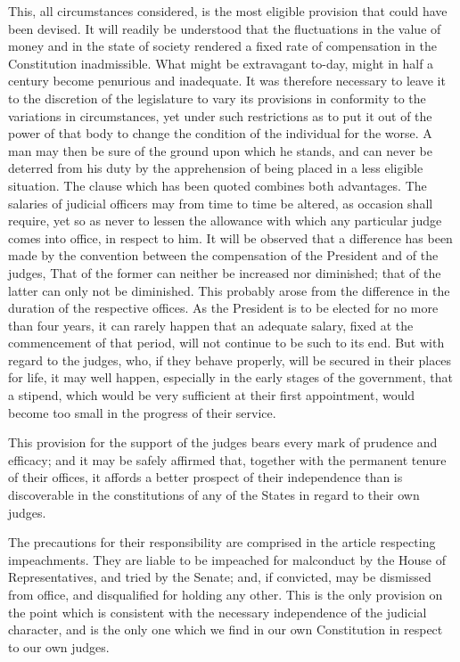 This, all circumstances considered, is the most eligible provision that could have been devised. 
It will readily be understood that the fluctuations in the value of money and in the state of society rendered a fixed rate of compensation in the Constitution inadmissible. 
What might be extravagant to-day, might in half a century become penurious and inadequate. 
It was therefore necessary to leave it to the discretion of the legislature to vary its provisions in conformity to the variations in circumstances, yet under such restrictions as to put it out of the power of that body to change the condition of the individual for the worse. 
A man may then be sure of the ground upon which he stands, and can never be deterred from his duty by the apprehension of being placed in a less eligible situation. 
The clause which has been quoted combines both advantages. 
The salaries of judicial officers may from time to time be altered, as occasion shall require, yet so as never to lessen the allowance with which any particular judge comes into office, in respect to him. 
It will be observed that a difference has been made by the convention between the compensation of the President and of the judges, That of the former can neither be increased nor diminished; that of the latter can only not be diminished. 
This probably arose from the difference in the duration of the respective offices. 
As the President is to be elected for no more than four years, it can rarely happen that an adequate salary, fixed at the commencement of that period, will not continue to be such to its end. 
But with regard to the judges, who, if they behave properly, will be secured in their places for life, it may well happen, especially in the early stages of the government, that a stipend, which would be very sufficient at their first appointment, would become too small in the progress of their service.

This provision for the support of the judges bears every mark of prudence and efficacy; and it may be safely affirmed that, together with the permanent tenure of their offices, it affords a better prospect of their independence than is discoverable in the constitutions of any of the States in regard to their own judges.

The precautions for their responsibility are comprised in the article respecting impeachments. 
They are liable to be impeached for malconduct by the House of Representatives, and tried by the Senate; and, if convicted, may be dismissed from office, and disqualified for holding any other. 
This is the only provision on the point which is consistent with the necessary independence of the judicial character, and is the only one which we find in our own Constitution in respect to our own judges.

